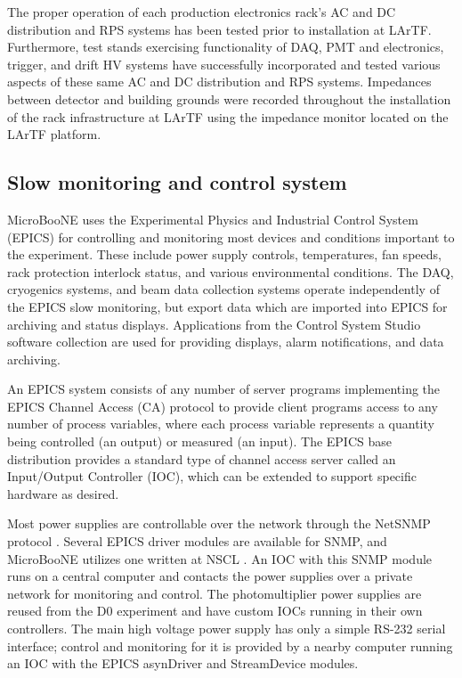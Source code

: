 The proper operation of each production electronics rack's AC and DC distribution and RPS systems has been tested prior to installation at LArTF.  Furthermore, test stands exercising functionality of DAQ, PMT and \lartpc electronics, trigger, and drift HV systems have successfully incorporated and tested various aspects of these same AC and DC distribution and RPS systems.  Impedances between detector and building grounds were recorded throughout the installation of the rack infrastructure at LArTF using the impedance monitor located on the LArTF platform.  %



\subsection{Slow monitoring and control system}

MicroBooNE uses the Experimental Physics and Industrial Control System (EPICS) \cite{EPICS} for controlling and monitoring most devices and conditions important to the experiment.  These include power supply controls, temperatures, fan speeds, rack protection interlock status, and various environmental conditions.  The DAQ, cryogenics systems, and beam data collection systems operate independently of the EPICS slow monitoring, but export data which are imported into EPICS for archiving and status displays.  Applications from the Control System Studio software collection \cite{ControlSystemStudio} are used for providing displays, alarm notifications, and data archiving.

An EPICS system consists of any number of server programs implementing the EPICS Channel Access (CA) protocol \cite{EPICS_CAP_Spec} to provide client programs access to any number of process variables, where each process variable represents a quantity being controlled (an output) or measured (an input).  The EPICS base distribution provides a standard type of channel access server called an Input/Output Controller (IOC), which can be extended to support specific hardware as desired.

Most power supplies are controllable over the network through the NetSNMP protocol \cite{NetSNMP}.  Several EPICS driver modules are available for SNMP, and MicroBooNE utilizes one written at NSCL \cite{devSNMP}.  An IOC with this SNMP module runs on a central computer and contacts the power supplies over a private network for monitoring and control.  The photomultiplier power supplies are reused from the D0 experiment and have custom IOCs running in their own controllers.  The main high voltage power supply has only a simple RS-232 serial interface; control and monitoring for it is provided by a nearby computer running an IOC with the EPICS asynDriver \cite{asynDriver} and StreamDevice \cite{StreamDevice} modules.

